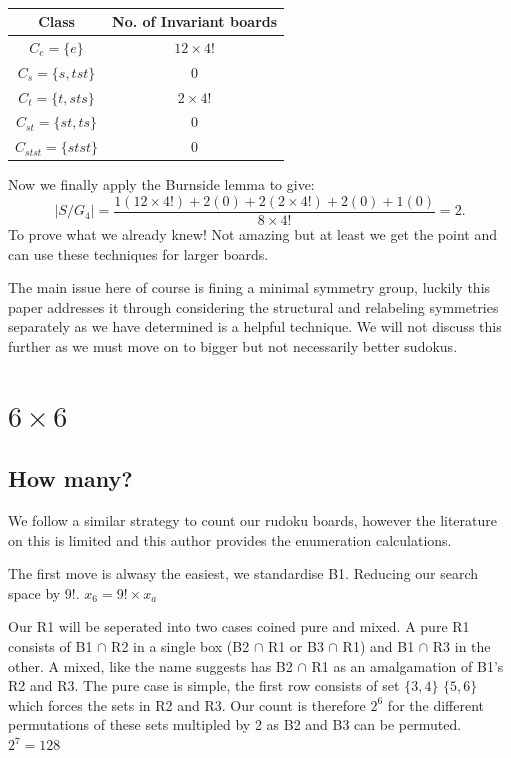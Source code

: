 \documentclass[a4paper,11pt]{report}
\newcounter{row}
\begin{document}
\begin{table}[!h]
\begin{center}
\begin{tabular}{ |c|c| }
 \hline
Class  & No. of Invariant boards\\
 \hline
$C_e=\{e\}$&$12\times 4!$\\
$C_s = \{s,tst\}$&0\\
$C_t = \{t,sts\}$&$2\times4!$\\
$C_{st}=\{st,ts\}$&0\\
$C_{stst}=\{stst\}$&0\\
\hline
\end{tabular}
\end{center}
\caption{\label{table:burnside}}
\end{table}

Now we finally apply the Burnside lemma to give:
\begin{equation}|S/G_4|=\frac{1(12\times 4!)+ 2(0)+2(2\times 4!)+2(0)+1(0)}{8\times 4!}=2.\end{equation}
To prove what we already knew! Not amazing but at least we get the point and can use these techniques for larger boards.

The main issue here of course is fining a minimal symmetry group, luckily this paper addresses it \cite{minimal complete shidoku symmetry groups} through considering the structural and relabeling symmetries separately as we have determined is a helpful technique. We will not discuss this further as we must move on to bigger but not necessarily better sudokus.

	\section{$6 \times 6$}
	
\subsection{How many?}

We follow a similar strategy to count our rudoku boards, however the literature on this is limited and this author provides the enumeration calculations. 

The first move is alwasy the easiest, we standardise B1. Reducing our search space by 9!.  $x_6=9!\times x_a$

Our R1 will be seperated into two cases coined pure and mixed. A pure R1 consists of B1 $\cap$ R2 in a single box (B2 $\cap$ R1 or B3 $\cap$ R1) and B1 $\cap$ R3 in the other. A mixed, like the name suggests has B2 $\cap$ R1 as an amalgamation of B1's R2 and R3. The pure case is simple, the first row consists of set $\{3,4\}$ $\{5,6\}$ which forces the sets in R2 and R3. Our count is therefore $2^6$ for the different permutations of these sets multipled by 2 as B2 and B3 can be permuted. $2^7=128$
\end{document}
